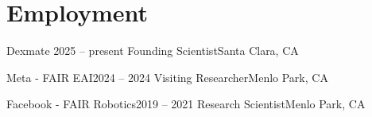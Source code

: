 \section{Employment}
  \resumeSubHeadingListStart
    \resumeSubheading
      {Dexmate }{2025 -- present}
      {Founding Scientist}{Santa Clara, CA}
     
     \resumeSubheading
      {Meta - FAIR EAI}{2024 -- 2024}
      {Visiting Researcher}{Menlo Park, CA} 
      
    \resumeSubheading
      {Facebook - FAIR Robotics}{2019 -- 2021}
      {Research Scientist}{Menlo Park, CA}

  
  

    
    

  \resumeSubHeadingListEnd
